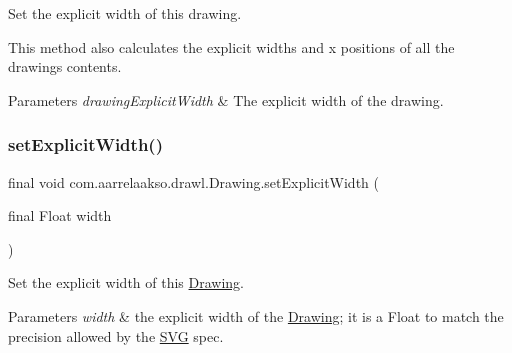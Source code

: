 Set the explicit width of this drawing. 

This method also calculates the explicit widths and x positions of all the drawing\textquotesingle{}s contents.


\begin{DoxyParams}{Parameters}
{\em drawing\+Explicit\+Width} & The explicit width of the drawing. \\
\hline
\end{DoxyParams}
\mbox{\label{classcom_1_1aarrelaakso_1_1drawl_1_1_drawing_a94179f3b7c6b4619a2b86cc9f7716a77}} 
\subsubsection{\texorpdfstring{set\+Explicit\+Width()}{setExplicitWidth()}\hspace{0.1cm}{\footnotesize\ttfamily [2/3]}}
{\footnotesize\ttfamily final void com.\+aarrelaakso.\+drawl.\+Drawing.\+set\+Explicit\+Width (\begin{DoxyParamCaption}\item[{final Float}]{width }\end{DoxyParamCaption})}



Set the explicit width of this \hyperlink{classcom_1_1aarrelaakso_1_1drawl_1_1_drawing}{Drawing}. 


\begin{DoxyParams}{Parameters}
{\em width} & the explicit width of the \hyperlink{classcom_1_1aarrelaakso_1_1drawl_1_1_drawing}{Drawing}; it is a Float to match the precision allowed by the \hyperlink{classcom_1_1aarrelaakso_1_1drawl_1_1_s_v_g}{S\+VG} spec. \\
\hline
\end{DoxyParams}
\mbox{\label{classcom_1_1aarrelaakso_1_1drawl_1_1_drawing_ac3b714abeb0f6132196b8a1e50b6de41}} 
